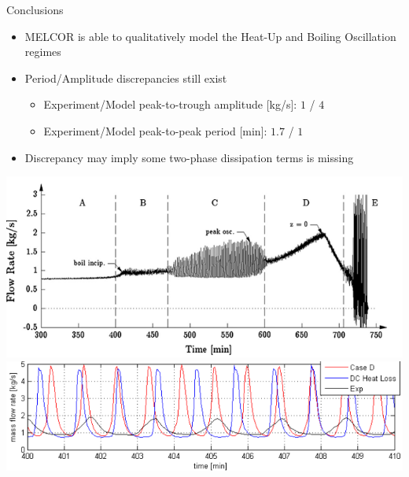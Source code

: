 \documentclass[10pt,t,xcolor=table]{UWMadBeamer}
\begin{document}
\begin{frame} {Conclusions}
    \begin{itemize}
        \item MELCOR is able to qualitatively model the Heat-Up and Boiling Oscillation regimes
        \item Period/Amplitude discrepancies still exist
        \begin{itemize}
            \item Experiment/Model peak-to-trough amplitude [kg/s]: $1$ / $4$
            \item Experiment/Model peak-to-peak period [min]: $1.7$ / $1$
        \end{itemize}
        \item Discrepancy may imply some two-phase dissipation terms is missing
    \end{itemize}
    \vfill
    {
    \centering
    \includegraphics[height=0.24\paperheight]{BoilingRegimes}%
    \hfill
    \includegraphics[keepaspectratio=false,width=0.5\paperwidth,height=0.25\paperheight]{Comparison_Piping2}%
    \hfill
    }
\end{frame}
\end{document}
